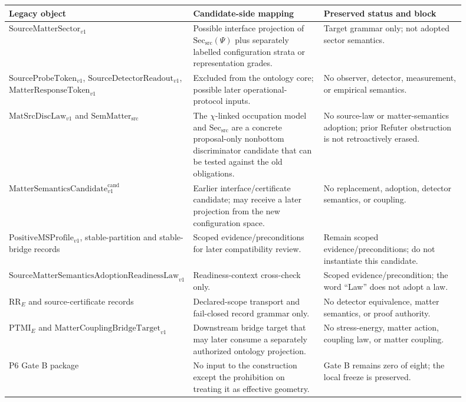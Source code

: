 \documentclass[11pt]{article}
\newcommand{\Sect}{\mathrm{Sec}_{\mathrm{src}}}
\begin{document}
\begin{longtable}{p{0.25\linewidth}p{0.31\linewidth}p{0.34\linewidth}}
\toprule
Legacy object & Candidate-side mapping & Preserved status and block \\
\midrule
\endhead
\(\mathrm{SourceMatterSector}_{v1}\) &
Possible interface projection of \(\Sect(\Psi)\) plus separately labelled
configuration strata or representation grades. &
Target grammar only; not adopted sector semantics.\\
\(\mathrm{SourceProbeToken}_{v1}\),
\(\mathrm{SourceDetectorReadout}_{v1}\),
\(\mathrm{MatterResponseToken}_{v1}\) &
Excluded from the ontology core; possible later operational-protocol inputs. &
No observer, detector, measurement, or empirical semantics.\\
\(\mathrm{MatSrcDiscLaw}_{v1}\) and
\(\mathrm{SemMatter}_{\mathrm{src}}\) &
The \(\chi\)-linked occupation model and \(\Sect\) are a concrete
proposal-only nonbottom discriminator candidate that can be tested against
the old obligations. &
No source-law or matter-semantics adoption; prior Refuter obstruction is not
retroactively erased.\\
\(\mathrm{MatterSemanticsCandidate}^{\mathrm{cand}}_{v1}\) &
Earlier interface/certificate candidate; may receive a later projection from
the new configuration space. &
No replacement, adoption, detector semantics, or coupling.\\
\(\mathrm{PositiveMSProfile}_{v1}\),
stable-partition and stable-bridge records &
Scoped evidence/preconditions for later compatibility review. &
Remain scoped evidence/preconditions; do not instantiate this candidate.\\
\(\mathrm{SourceMatterSemanticsAdoptionReadinessLaw}_{v1}\) &
Readiness-context cross-check only. &
Scoped evidence/precondition; the word ``Law'' does not adopt a law.\\
\(\mathrm{RR}_E\) and source-certificate records &
Declared-scope transport and fail-closed record grammar only. &
No detector equivalence, matter semantics, or proof authority.\\
\(\mathrm{PTMI}_E\) and
\(\mathrm{MatterCouplingBridgeTarget}_{v1}\) &
Downstream bridge target that may later consume a separately authorized
ontology projection. &
No stress-energy, matter action, coupling law, or matter coupling.\\
P6 Gate B package &
No input to the construction except the prohibition on treating it as
effective geometry. &
Gate B remains zero of eight; the local freeze is preserved.\\
\bottomrule
\end{longtable}
\end{document}
